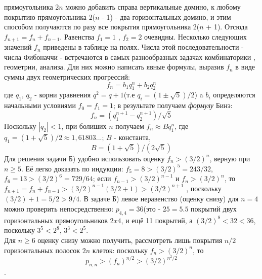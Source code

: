 \begin{multicols}{2}
\columnbreak

\raggedright 
прямоугольника 2\(n\) можно добавить справа вертикальные домино, к любому покрытию
прямоугольника 2(\(n\) - 1) - два горизонтальных домино, и этим способом получаются по разу
все покрытия прямоугольника 2(\(n\) + 1). Отсюда \(f_{n + 1} = f_{n} + f_{n - 1}\). Равенства \(f_{1} = 1\)
, \(f_{2} = 2\) очевидны. Несколько следующих значений \(f_{n}\) приведены в таблице на полях. \newline
Числа этой последовательности - числа Фибоначчи - встречаются в самых разнообразных задачах комбинаторики
, геометрии, анализа. Для них можно написать явные формулы, выразив \(f_{n}\) в виде суммы двух
геометрических прогрессий:
    \[f_{n} = b_{1}q_{1}^{n} + b_{2}q_{2}^{n}\]
где \(q_{1}\), \(q_{2}\) - корни уравнения \(q^{2} = q + 1\)(т.е \(q_{i} = (1 \pm \sqrt{5}) / 2\)) a \(b_{i}\)
определяются начальными условиями \(f_{0} = f_{1} = 1\); в результате получаем \textit{формулу} Бинэ:
    \[f_{n} = (q_{1}^{n + 1} - q_{2}^{n + 1}) / \sqrt{5}\]
Поскольку \(|q_{2}| < 1\), при болиших \(n\) получаем \(f_{n} \approx B q_{1}^{n}\), где \(q_{1} = (1 + \sqrt{5}) / 2 \approx 1,61803...\);
\(B\) - константа,
    \[B = (1 + \sqrt{5}) / (2\sqrt{5})\]
Для решения задачи Б) удобно использовать оценку \(f_{n} > (3/2)^{n}\), верную при \(n \geq 5\). Её легко доказать
по индукции: \(f_{5} = 8 > (3/2)^{5} = 243 / 32\), \(f_{6} = 13 > (3/2)^{6} = 729 / 64\);
если \(f_{n - 1} > (3/2)^{n - 1}\) и \(f_{n} > (3/2)^{n}\), то \(f_{n + 1} = f_{n} + f_{n - 1} > (3/2)^{n - 1}(3/2 + 1) > (3/2)^{n + 1}\)
, поскольку \((3/2) + 1 = 5/2 > 9/4\).\newline
В задаче Б) левое неравенство (оценку снизу) для \(n = 4\) можно проверить непосредственно: \(p_{4,4} = 36\)(это - \(25 = 5.5\)
покрытий двух горизонтальных прямоугольников \(2 x 4\), и ещё 11 покрытий, а \((3/2)^{8} < 32 < 36\), поскольку \(3^{5} < 2^{8}\), \(3^{3} < 2^{5}\).\\
Для \(n \geq 6\) оценку снизу можно получить, рассмотреть лишь покрытия \(n/2\) горизонтальных полосок \(2n\) клеток:
поскольку \(f_{n} > (3/2)^{n}\), то
    \[p_{n, n} > (f_{n})^{n/2} > (3/2)^{n^{2}/2}\].


\end{multicols}